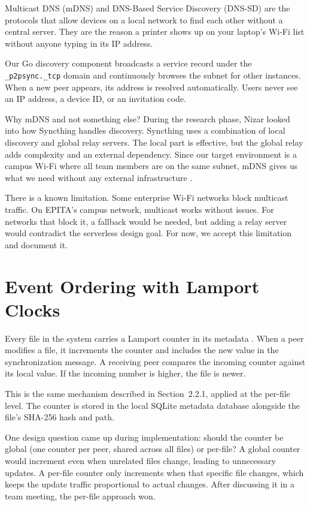 Multicast DNS (mDNS) and DNS-Based Service Discovery (DNS-SD) \cite{rfc6762, rfc6763} are the protocols that allow devices on a local network to find each other without a central server. They are the reason a printer shows up on your laptop's Wi-Fi list without anyone typing in its IP address.

Our Go discovery component broadcasts a service record under the \texttt{\_p2psync.\_tcp} domain and continuously browses the subnet for other instances. When a new peer appears, its address is resolved automatically. Users never see an IP address, a device ID, or an invitation code.

Why mDNS and not something else? During the research phase, Nizar looked into how Syncthing handles discovery. Syncthing uses a combination of local discovery and global relay servers. The local part is effective, but the global relay adds complexity and an external dependency. Since our target environment is a campus Wi-Fi where all team members are on the same subnet, mDNS gives us what we need without any external infrastructure \cite{syncthing}.

There is a known limitation. Some enterprise Wi-Fi networks block multicast traffic. On EPITA's campus network, multicast works without issues. For networks that block it, a fallback would be needed, but adding a relay server would contradict the serverless design goal. For now, we accept this limitation and document it.

\section{Event Ordering with Lamport Clocks}

Every file in the system carries a Lamport counter in its metadata \cite{lamport1978}. When a peer modifies a file, it increments the counter and includes the new value in the synchronization message. A receiving peer compares the incoming counter against its local value. If the incoming number is higher, the file is newer.

This is the same mechanism described in Section~2.2.1, applied at the per-file level. The counter is stored in the local SQLite metadata database alongside the file's SHA-256 hash and path.

One design question came up during implementation: should the counter be global (one counter per peer, shared across all files) or per-file? A global counter would increment even when unrelated files change, leading to unnecessary updates. A per-file counter only increments when that specific file changes, which keeps the update traffic proportional to actual changes. After discussing it in a team meeting, the per-file approach won.

